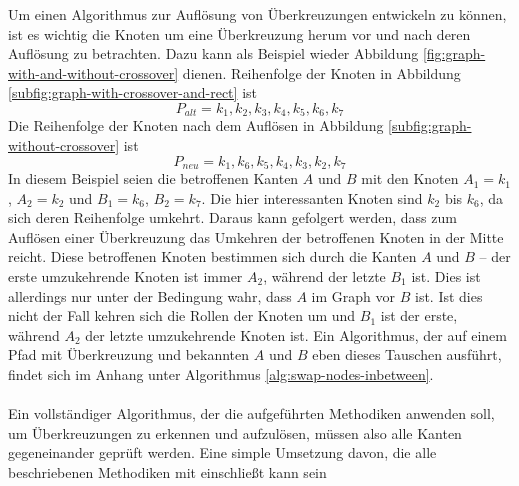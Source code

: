 Um einen Algorithmus zur Auflösung von Überkreuzungen entwickeln zu können, ist es wichtig die Knoten um eine Überkreuzung herum vor und nach deren Auflösung zu betrachten.
Dazu kann als Beispiel wieder Abbildung \vref{fig:graph-with-and-without-crossover} dienen.
Reihenfolge der Knoten in Abbildung \vref{subfig:graph-with-crossover-and-rect} ist $$P_{alt} = k_1, k_2, k_3, k_4, k_5, k_6, k_7$$
Die Reihenfolge der Knoten nach dem Auflösen in Abbildung \vref{subfig:graph-without-crossover} ist $$P_{neu} = k_1, k_6, k_5, k_4, k_3, k_2, k_7$$
In diesem Beispiel seien die betroffenen Kanten $A$ und $B$ mit den Knoten $A_1 = k_1$, $A_2 = k_2$ und $B_1 = k_6$, $B_2 = k_7$.
Die hier interessanten Knoten sind $k_2$ bis $k_6$, da sich deren Reihenfolge umkehrt.
Daraus kann gefolgert werden, dass zum Auflösen einer Überkreuzung das Umkehren der betroffenen Knoten in der Mitte reicht.
Diese betroffenen Knoten bestimmen sich durch die Kanten $A$ und $B$ -- der erste umzukehrende Knoten ist immer $A_2$, während der letzte $B_1$ ist.
Dies ist allerdings nur unter der Bedingung wahr, dass $A$ im Graph vor $B$ ist.
Ist dies nicht der Fall kehren sich die Rollen der Knoten um und $B_1$ ist der erste, während $A_2$ der letzte umzukehrende Knoten ist.
Ein Algorithmus, der auf einem Pfad mit Überkreuzung und bekannten $A$ und $B$ eben dieses Tauschen ausführt, findet sich im Anhang unter Algorithmus \vref{alg:swap-nodes-inbetween}.
\\\\
Ein vollständiger Algorithmus, der die aufgeführten Methodiken anwenden soll, um Überkreuzungen zu erkennen und aufzulösen, müssen also alle Kanten gegeneinander geprüft werden.
Eine simple Umsetzung davon, die alle beschriebenen Methodiken mit einschließt kann sein

